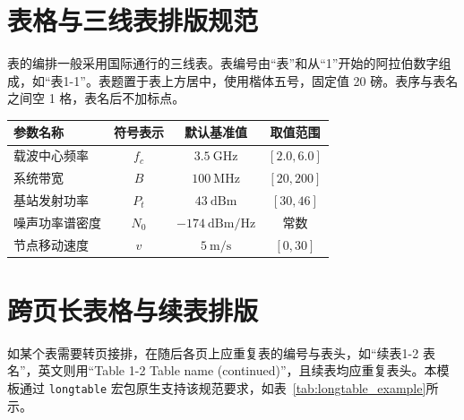 \section{表格与三线表排版规范}

表的编排一般采用国际通行的三线表。表编号由“表”和从“1”开始的阿拉伯数字组成，如“表1-1”。表题置于表上方居中，使用楷体五号，固定值 20 磅。表序与表名之间空 1 格，表名后不加标点。

\begin{table}[htbp]
  \centering
  \label{tab:system_params}
  \renewcommand{\arraystretch}{1.3}
  \begin{tabular}{lccc}
    \toprule
    参数名称 & 符号表示 & 默认基准值 & 取值范围 \\
    \midrule
    载波中心频率 & $f_c$ & $3.5\ \mathrm{GHz}$ & $[2.0, 6.0]$ \\
    系统带宽 & $B$ & $100\ \mathrm{MHz}$ & $[20, 200]$ \\
    基站发射功率 & $P_t$ & $43\ \mathrm{dBm}$ & $[30, 46]$ \\
    噪声功率谱密度 & $N_0$ & $-174\ \mathrm{dBm/Hz}$ & 常数 \\
    节点移动速度 & $v$ & $5\ \mathrm{m/s}$ & $[0, 30]$ \\
    \bottomrule
  \end{tabular}
\end{table}

\section{跨页长表格与续表排版}

如某个表需要转页接排，在随后各页上应重复表的编号与表头，如“续表1-2 表名”，英文则用“Table 1-2 Table name (continued)”，且续表均应重复表头。本模板通过 \texttt{longtable} 宏包原生支持该规范要求，如表~\ref{tab:longtable_example}所示。

